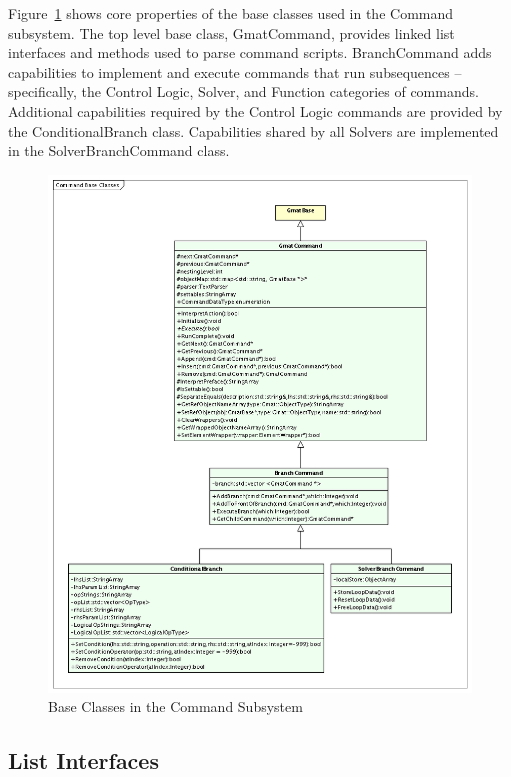 Figure~\ref{figure:CommandBaseClasses} shows core properties of the base classes used in the Command
subsystem.  The top level base class, GmatCommand, provides linked list interfaces and methods used
to parse command scripts.  BranchCommand adds capabilities to implement and execute commands that
run subsequences -- specifically, the Control Logic, Solver, and Function categories of commands.
Additional capabilities required by the Control Logic commands are provided by the ConditionalBranch
class.  Capabilities shared by all Solvers are implemented in the SolverBranchCommand class.

\begin{figure}
\begin{center}
\includegraphics[405,520]{Images/CommandBaseClasses.png}
\caption{\label{figure:CommandBaseClasses}Base Classes in the Command Subsystem}
\end{center}
\end{figure}

\subsection{List Interfaces}

